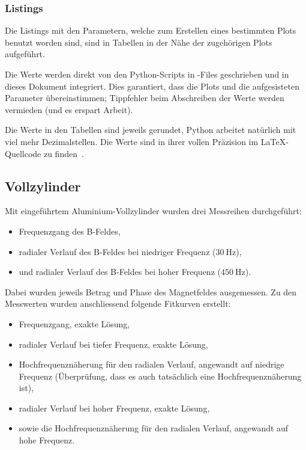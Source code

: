 \subsubsection{Listings}
\label{sec:ausw:subsec:methodik:subsubsec:listings}

Die Listings mit  den Parametern, welche zum Erstellen  eines bestimmten Plots
benutzt worden  sind, sind in Tabellen  in der N\"ahe der  zugeh\"origen Plots
aufgef\"uhrt.

Die  Werte   werden  direkt  von  den   Python-Scripts  in  -Files
geschrieben und in dieses Dokument integriert. Dies garantiert, dass die Plots
und die aufgesisteten Parameter  \"ubereinstimmen; Tippfehler beim Abschreiben
der Werte werden vermieden (und es erspart Arbeit).

Die Werte in  den Tabellen sind jeweils gerundet,  Python arbeitet nat\"urlich
mit viel  mehr Dezimalstellen. Die Werte  sind in ihrer vollen  Pr\"azision im
\LaTeX-Quellcode zu finden~\cite{ref:aw:github}.


\clearpage
\subsection{Vollzylinder}
\label{sec:ausw:subsec:hohlz}

Mit   eingef\"uhrtem   Aluminium-Vollzylinder   wurden   drei   Messreihen
durchgef\"uhrt:
\begin{itemize}
    \item
        Frequenzgang des B-Feldes,
    \item
        radialer    Verlauf    des    B-Feldes    bei    niedriger    Frequenz
        ($\SI{30}{\hertz}$),
    \item
        und    radialer   Verlauf    des   B-Feldes    bei   hoher    Frequenz
        ($\SI{450}{\hertz}$).
\end{itemize}

Dabei wurden  jeweils Betrag  und Phase  des Magnetfeldes  ausgemessen. Zu den
Messwerten wurden anschliessend folgende Fitkurven erstellt:
\begin{itemize}
    \item
        Frequenzgang, exakte L\"osung,
    \item
        radialer Verlauf bei tiefer Frequenz, exakte L\"osung,
    \item
        Hochfrequenzn\"aherung  f\"ur  den  radialen  Verlauf,  angewandt  auf
        niedrige Frequenz  (\"Uberpr\"ufung, dass  es auch  tats\"achlich eine
        Hochfrequenzn\"aherung ist),
    \item
        radialer Verlauf bei hoher Frequenz, exakte L\"osung,
    \item
        sowie die Hochfrequenzn\"aherung f\"ur den radialen Verlauf, angewandt
        auf hohe Frequenz.
\end{itemize}

